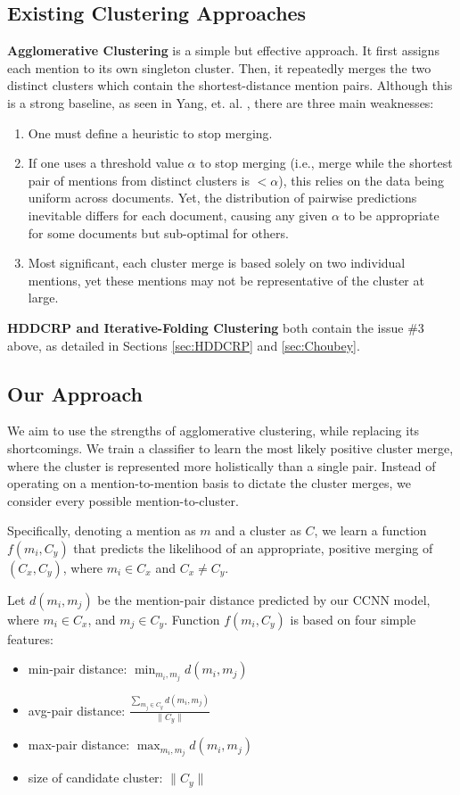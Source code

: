 \documentclass[11pt,a4paper]{article}
\begin{document}
\subsection{Existing Clustering Approaches}
\textbf{Agglomerative Clustering} is a simple but effective approach.  It first assigns each mention to its own singleton cluster.  Then, it repeatedly merges the two distinct clusters which contain the shortest-distance mention pairs.  Although this is a strong baseline, as seen in Yang, et. al. , there are three main weaknesses:
\begin{enumerate}
\item One must define a heuristic to stop merging.
\item If one uses a threshold value $\alpha$ to stop merging (i.e., merge while the shortest pair of mentions from distinct clusters is $<\alpha$), this relies on the data being uniform across documents. Yet, the distribution of pairwise predictions inevitable differs for each document, causing any given $\alpha$ to be appropriate for some documents but sub-optimal for others.
\item Most significant, each cluster merge is based solely on two individual mentions, yet these mentions may not be representative of the cluster at large.
\end{enumerate}

\textbf{HDDCRP and Iterative-Folding Clustering} both contain the issue \#3 above, as detailed in Sections \ref{sec:HDDCRP} and \ref{sec:Choubey}.

\subsection{Our Approach}
We aim to use the strengths of agglomerative clustering, while replacing its shortcomings.  We train a classifier to learn the most likely {positive cluster merge}, where the cluster is represented more holistically than a single pair.  Instead of operating on a mention-to-mention basis to dictate the cluster merges, we consider every possible mention-to-cluster.

Specifically, denoting a mention as $m$ and a cluster as $C$, we learn a function $f(m_i,C_y)$ that predicts the likelihood of an appropriate, positive merging of $(C_x,C_y)$, where $m_i \in C_x$ and $C_x \neq C_y$.

Let $d(m_i,m_j)$ be the mention-pair distance predicted by our CCNN model, where $m_i \in C_x$, and $m_j \in C_y$.  Function $f(m_i,C_y)$ is based on four simple features:
\begin{itemize}
  \item min-pair distance: $\min_{m_i,m_j} d(m_i,m_j)$
  \item avg-pair distance: $\frac{\sum_{m_j \in C_y} d(m_i,m_j)}{\|C_y\|}$
  \item max-pair distance: $\max_{m_i,m_j} d(m_i,m_j)$
  \item size of candidate cluster: $\|C_y\|$
\end{itemize}
\end{document}
